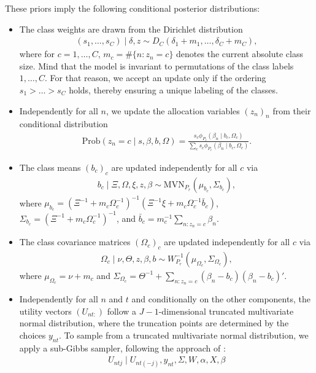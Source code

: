 \documentclass[article]{jss}
\begin{document}
These priors imply the following conditional posterior distributions:
\begin{itemize}
  \item The class weights are drawn from the Dirichlet distribution
  \begin{align*}
  (s_1,\dots,s_C)\mid \delta,z \sim D_C(\delta_1+m_1,\dots,\delta_C+m_C),
  \end{align*}
  where for $c=1,\dots,C$, $m_c=\#\{n:z_n=c\}$ denotes the current absolute class size. Mind that the model is invariant to permutations of the class labels $1,\dots,C$. For that reason, we accept an update only if the ordering $s_1>\dots>s_C$ holds, thereby ensuring a unique labeling of the classes.
  \item Independently for all $n$, we update the allocation variables $(z_n)_n$ from their conditional distribution
  \begin{align*}
  \text{Prob}(z_n=c\mid s,\beta,b,\Omega )=\frac{s_c\phi_{P_r}(\beta_n\mid b_c,\Omega_c)}{\sum_c s_c\phi_{P_r}(\beta_n\mid b_c,\Omega_c)}.
  \end{align*}
  \item The class means $(b_c)_c$ are updated independently for all $c$ via
  \begin{align*}
  b_c\mid \Xi,\Omega,\xi,z,\beta \sim\text{MVN}_{P_r}\left( \mu_{b_c}, \Sigma_{b_c}  \right),
  \end{align*}
  where $\mu_{b_c}=(\Xi^{-1}+m_c\Omega_c^{-1})^{-1}(\Xi^{-1}\xi +m_c\Omega_c^{-1}\bar{b}_c)$, $\Sigma_{b_c}=(\Xi^{-1}+m_c\Omega_c^{-1})^{-1}$, and $\bar{b}_c=m_c^{-1}\sum_{n:z_n=c} \beta_n$.
    \item The class covariance matrices $(\Omega_c)_c$ are updated independently for all $c$ via
  \begin{align*}
  \Omega_c \mid \nu,\Theta,z,\beta,b \sim W^{-1}_{P_r}(\mu_{\Omega_c},\Sigma_{\Omega_c}),
  \end{align*}
  where $\mu_{\Omega_c}=\nu+m_c$ and $\Sigma_{\Omega_c}=\Theta^{-1} + \sum_{n:z_n=c} (\beta_n-b_c)(\beta_n-b_c)'$.
  \item Independently for all $n$ and $t$ and conditionally on the other components, the utility vectors $(U_{nt:})$ follow a $J-1$-dimensional truncated multivariate normal distribution, where the truncation points are determined by the choices $y_{nt}$. To sample from a truncated multivariate normal distribution, we apply a sub-Gibbs sampler, following the approach of \cite{Geweke:1998}:
  \begin{align*}
  U_{ntj} \mid U_{nt(-j)},y_{nt},\Sigma,W,\alpha,X,\beta

\end{align*}
\end{itemize}
\end{document}

